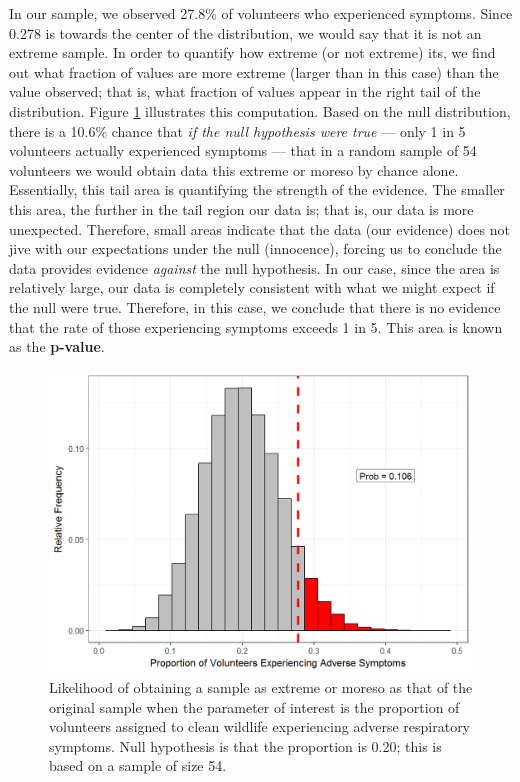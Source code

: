 \documentclass[]{book}
\theoremstyle{definition}
\theoremstyle{definition}
\theoremstyle{remark}
\begin{document}
In our sample, we observed 27.8\% of volunteers who experienced
symptoms. Since 0.278 is towards the center of the distribution, we
would say that it is not an extreme sample. In order to quantify how
extreme (or not extreme) its, we find out what fraction of values are
more extreme (larger than in this case) than the value observed; that
is, what fraction of values appear in the right tail of the
distribution. Figure \ref{fig:nulldistns-deepwater-pvalue} illustrates
this computation. Based on the null distribution, there is a 10.6\%
chance that \emph{if the null hypothesis were true} --- only 1 in 5
volunteers actually experienced symptoms --- that in a random sample of
54 volunteers we would obtain data this extreme or moreso by chance
alone. Essentially, this tail area is quantifying the strength of the
evidence. The smaller this area, the further in the tail region our data
is; that is, our data is more unexpected. Therefore, small areas
indicate that the data (our evidence) does not jive with our
expectations under the null (innocence), forcing us to conclude the data
provides evidence \emph{against} the null hypothesis. In our case, since
the area is relatively large, our data is completely consistent with
what we might expect if the null were true. Therefore, in this case, we
conclude that there is no evidence that the rate of those experiencing
symptoms exceeds 1 in 5. This area is known as the \textbf{p-value}.

\begin{figure}

{\centering \includegraphics[width=0.8\linewidth]{./Images/nulldistns-deepwater-pvalue-1} 

}

\caption{Likelihood of obtaining a sample as extreme or moreso as that of the original sample when the parameter of interest is the proportion of volunteers assigned to clean wildlife experiencing adverse respiratory symptoms.  Null hypothesis is that the proportion is 0.20; this is based on a sample of size 54.}\label{fig:nulldistns-deepwater-pvalue}
\end{figure}
\end{document}
